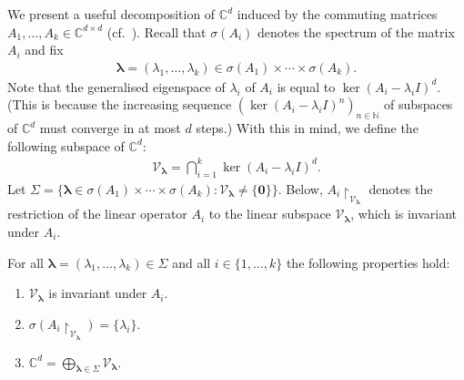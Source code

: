 \documentclass[format=acmsmall, review=false, screen=true]{acmart}
\newcommand{\Complex}{\mathbb{C}}
\newcommand{\Naturals}{\mathbb{N}}
\newcommand{\myvector}{\boldsymbol}
\begin{document}
We present a useful decomposition of $\Complex^{d}$ induced
by the commuting matrices $A_{1}, \ldots, A_{k} \in \Complex^{d \times
  d}$ (cf.~\cite[Section 2]{ABC}). Recall that $\sigma(A_{i})$ denotes
the spectrum of the matrix $A_{i}$ and fix
\begin{align*}
\myvector{\lambda} = (\lambda_{1}, \ldots, \lambda_{k}) \in \sigma(A_{1}) \times \cdots \times \sigma(A_{k}) .
\end{align*}
Note that the generalised eigenspace of $\lambda_{i}$ of $A_{i}$ is equal to $\ker{(A_{i} - \lambda_{i} I)}^{d}$.  (This is because  the increasing sequence ${(\ker{(A_{i} - \lambda_{i} I)}^{n})}_{n \in \Naturals}$ 
of subspaces of $\Complex^d$ must converge in at most $d$ steps.)
With this in mind, we define the following subspace of $\Complex^{d}$:
\begin{align*}
\mathcal{V}_{\myvector{\lambda}} = \bigcap \limits_{i=1}^{k} \ker{(A_{i} - \lambda_{i} I)}^{d}.
\end{align*}
Let $\Sigma = \lbrace \myvector{\lambda} \in \sigma(A_{1}) \times
\cdots \times \sigma(A_{k}) : \mathcal{V}_{\myvector{\lambda}} \neq
\lbrace \myvector{0} \rbrace \rbrace$.  Below, $A_{i}
\restriction_{\mathcal{V}_{\myvector{\lambda}}}$ denotes the
restriction of the linear operator $A_{i}$ to the linear subspace
$\mathcal{V}_{\myvector{\lambda}}$, which is invariant under $A_{i}$.

\begin{theorem}
\label{subspace_decomposition}
For all $\myvector{\lambda} = (\lambda_{1}, \ldots, \lambda_{k}) \in
\Sigma$ and all $i \in \lbrace 1, \ldots, k \rbrace$ the
following properties hold:

\begin{enumerate}

\item $\mathcal{V}_{\myvector{\lambda}}$ is invariant under $A_{i}$.

\item $\sigma(A_{i} \restriction_{\mathcal{V}_{\myvector{\lambda}}}) = \lbrace \lambda_{i} \rbrace$.

\item $\Complex^{d} = \bigoplus \limits_{\myvector{\lambda} \in \Sigma} \mathcal{V}_{\myvector{\lambda}}$.

\end{enumerate}
\end{theorem}
\end{document}
